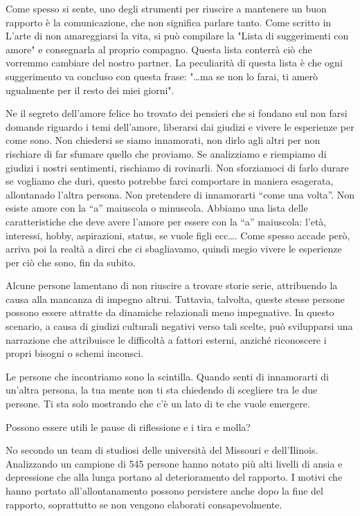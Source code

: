 \documentclass[12pt]{book} %
\begin{document}
Come spesso si sente, uno degli strumenti per riuscire a mantenere un buon rapporto è la comunicazione, che non significa parlare tanto. Come scritto in L'arte di non amareggiarsi la vita, si può compilare la "Lista di suggerimenti con amore" e consegnarla al proprio compagno. Questa lista conterrà ciò che vorremmo cambiare del nostro partner. La peculiarità di questa lista è che ogni suggerimento va concluso con questa frase: "…ma se non lo farai, ti amerò ugualmente per il resto dei miei giorni". 

Ne il segreto dell'amore felice ho trovato dei
pensieri che si fondano sul non farsi domande riguardo i temi dell'amore, liberarsi dai giudizi e
vivere le esperienze per come sono. Non chiedersi se siamo innamorati, non dirlo agli altri per non rischiare di far sfumare quello
che proviamo. Se analizziamo e riempiamo di giudizi i nostri sentimenti, rischiamo di rovinarli. Non sforziamoci di
farlo durare se vogliamo che duri, questo potrebbe farci comportare in maniera esagerata, allontanado l'altra persona.
Non pretendere di innamorarti “come una volta”. Non esiste amore con la “a” maiuscola o minuscola. Abbiamo una lista
delle caratteristiche che deve avere l'amore per essere con la “a” maiuscola:
l'età, interessi, hobby, aspirazioni, status, se vuole figli ecc…. Come spesso accade però, arriva poi la realtà a dirci che ci sbagliavamo, quindi megio vivere le esperienze per ciò che sono, fin da subito.

Alcune persone lamentano di non riuscire a trovare storie serie, attribuendo la causa alla mancanza di impegno altrui. Tuttavia, talvolta, queste stesse persone possono essere attratte da dinamiche relazionali meno impegnative. In questo scenario, a causa di giudizi culturali negativi verso tali scelte, può svilupparsi una narrazione che attribuisce le difficoltà a fattori esterni, anziché riconoscere i propri bisogni o schemi inconsci.

Le persone che incontriamo sono la scintilla. Quando senti di innamorarti di un'altra persona, la tua mente non ti sta chiedendo di
scegliere tra le due persone. Ti sta solo mostrando che c'è un lato di te che vuole emergere. 

\begin{mdframed}[linewidth=1pt]
Possono essere utili le pause di riflessione e i tira e molla?

No secondo un team di studiosi delle università del Missouri e dell'Ilinois. Analizzando un campione di 545 persone
hanno notato più alti livelli di ansia e depressione che alla lunga portano al deterioramento del rapporto. I motivi che hanno portato all'allontanamento possono persistere anche dopo la fine del rapporto, soprattutto se non vengono elaborati consapevolmente.
\end{mdframed}
\end{document}
